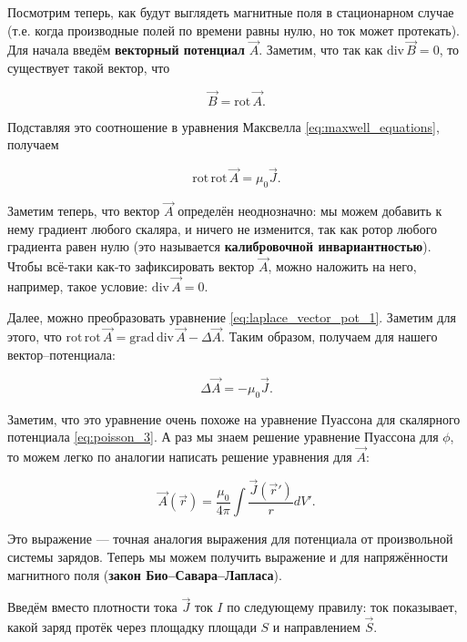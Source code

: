 \documentclass[11pt,a4paper]{article}
\numberwithin{equation}{section}
\newcommand{\grad}{\mathrm{grad}\,}
\newcommand{\rot}{\mathrm{rot}\,}
\renewcommand{\div}{\mathrm{div}\,}
\begin{document}
Посмотрим теперь, как будут выглядеть магнитные поля в стационарном
случае (т.е. когда производные полей по времени равны нулю, но ток
может протекать). Для начала введём \textbf{векторный потенциал}
$\vec{A}$. Заметим, что так как $\div \vec{B} = 0$, то существует
такой вектор, что 

\begin{equation}
  \label{eq:def_vector_potential}
  \vec{B} = \rot \vec{A}.
\end{equation}

Подставляя это соотношение в уравнения Максвелла
\eqref{eq:maxwell_equations}, получаем 

\begin{equation}
  \label{eq:laplace_vector_pot_1}
  \rot \rot \vec{A} = \mu_0 \vec{J}.
\end{equation}

Заметим теперь, что вектор $\vec{A}$ определён неоднозначно: мы можем
добавить к нему градиент любого скаляра, и ничего не изменится, так
как ротор любого градиента равен нулю (это называется
\textbf{калибровочной инвариантностью}). Чтобы всё-таки как-то
зафиксировать вектор $\vec{A}$, можно наложить на него, например,
такое условие: $\div \vec{A} = 0$.

Далее, можно преобразовать уравнение
\eqref{eq:laplace_vector_pot_1}. Заметим для этого, что $\rot \rot
\vec{A} = \grad \div \vec{A} - \Delta \vec{A}$. Таким образом,
получаем для нашего вектор--потенциала: 

\begin{equation}
  \label{eq:laplace_vector_pot_2}
  \Delta \vec{A} = - \mu_0 \vec{J}. 
\end{equation}

Заметим, что это уравнение очень похоже на уравнение Пуассона для
скалярного потенциала \eqref{eq:poisson_3}. А раз мы знаем решение
уравнение Пуассона для $\phi$, то можем легко по аналогии написать
решение уравнения для $\vec{A}$: 

\begin{equation}
  \label{eq:solution_vector_pot}
  \vec{A}(\vec{r}) = \frac{\mu_0}{4\pi} \int \frac{\vec{J}(\vec{r}')}{r} dV'.
\end{equation}

Это выражение --- точная аналогия выражения для потенциала от
произвольной системы зарядов. Теперь мы можем получить выражение и для
напряжённости магнитного поля (\textbf{закон
  Био--Савара--Лапласа}). 

Введём вместо плотности тока $\vec{J}$ ток $I$ по следующему правилу:
ток показывает, какой заряд протёк через площадку площади $S$ и
направлением $\vec{S}$.
\end{document}
